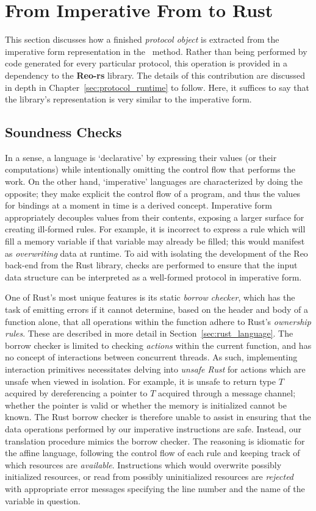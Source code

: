 \section{From Imperative From to Rust}
This section discusses how a finished \textit{protocol object} is extracted from the imperative form representation in the~ method. 
Rather than being performed by code generated for every particular protocol, this operation is provided in a dependency to the \textbf{Reo-rs} library. The details of this contribution are discussed in depth in Chapter~\ref{sec:protocol_runtime} to follow. Here, it suffices to say that the library's representation is very similar to the imperative form.

\subsection{Soundness Checks}
In a sense, a language is `declarative' by expressing their values (or their computations) while intentionally omitting the control flow that performs the work. On the other hand, `imperative' languages are characterized by doing the opposite; they make explicit the control flow of a program, and thus the values for bindings at a moment in time is a derived concept. Imperative form appropriately decouples values from their contents, exposing a larger surface for creating ill-formed rules. For example, it is incorrect to express a rule which will fill a memory variable if that variable may already be filled; this would manifest as \textit{overwriting} data at runtime. To aid with isolating the development of the Reo back-end from the Rust library, checks are performed to ensure that the input data structure can be interpreted as a well-formed protocol in imperative form. 

One of Rust's most unique features is its static \textit{borrow checker}, which has the task of emitting errors if it cannot determine, based on the header and body of a function alone, that all operations within the function adhere to Rust's \textit{ownership rules}. These are described in more detail in Section~\ref{sec:rust_language}. The borrow checker is limited to checking \textit{actions} within the current function, and has no concept of interactions between concurrent threads. As such, implementing interaction primitives necessitates delving into \textit{unsafe Rust} for actions which are unsafe when viewed in isolation. For example, it is unsafe to return type $T$ acquired by dereferencing a pointer to $T$ acquired through a message channel; whether the pointer is valid or whether the memory is initialized cannot be known. The Rust borrow checker is therefore unable to assist in ensuring that the data operations performed by our imperative instructions are safe. Instead, our translation procedure mimics the borrow checker. The reasoning is idiomatic for the affine language, following the control flow of each rule and keeping track of which resources are \textit{available}. Instructions which would overwrite possibly initialized resources, or read from possibly uninitialized resources are \textit{rejected} with appropriate error messages specifying the line number and the name of the variable in question. 

